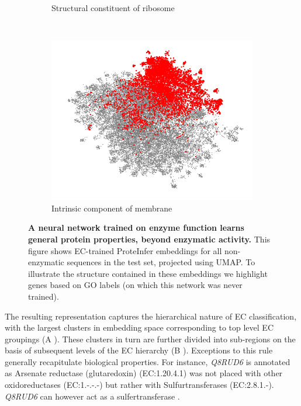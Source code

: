 \begin{figure}[t!]
\begin{subfigure}[t]{0.3\textwidth}
        \caption{Structural constituent of ribosome}
        \label{fig:tiger}
    \end{subfigure}
    ~ %
    \begin{subfigure}[t]{0.3\textwidth}
    \vskip 0pt
        \includegraphics[width=\textwidth]{membrane}
        \caption{Intrinsic component of membrane}
        \label{fig:mouse}
    \end{subfigure}
    \caption{\textbf{A neural network trained on enzyme function learns general protein properties, beyond enzymatic activity.} This figure shows EC-trained ProteInfer embeddings for all non-enzymatic sequences in the test set, projected using UMAP. To illustrate the structure contained in these embeddings we highlight genes based on GO labels (on which this network was never trained).}\label{fig:unsupervised_embedding}
\end{figure}
The resulting representation captures the hierarchical nature of EC classification, with the largest clusters in embedding space corresponding to top level EC groupings (A%
). These clusters in turn are further divided into sub-regions on the basis of subsequent levels of the EC hierarchy (B%
). Exceptions to this rule generally recapitulate biological properties. For instance, \emph{Q8RUD6} is annotated as Arsenate reductase (glutaredoxin) (EC:1.20.4.1) \cite{pmid25464340} was not placed with other oxidoreductases (EC:1.-.-.-) but rather with Sulfurtransferases (EC:2.8.1.-). \emph{Q8RUD6} can however act as a sulfertransferase \cite{pmid17408957}. 



